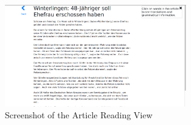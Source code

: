 \begin{figure}
	\caption{Screenshot of the Article Reading View}
	\label{fig:view3}
	\begin{center}
	\includegraphics[width=0.7\textwidth]{Graphics/View3}
\end{center}
\end{figure}